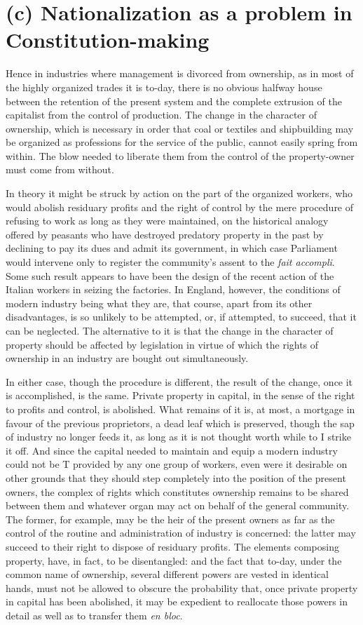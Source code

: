 \documentclass{book}
\begin{document}
\section{(c) Nationalization as a problem in Constitution-making}
Hence in industries where management is divorced from ownership, as in most of the highly organized trades it is to-day, there is no obvious halfway house between the retention of the present system and the complete extrusion of the capitalist from the control of production. The change in the character of ownership, which is necessary in order that coal or textiles and shipbuilding may be organized as professions for the service of the public, cannot easily spring from within. The blow needed to liberate them from the control of the property-owner must come from without.

In theory it might be struck by action on the part of the organized workers, who would abolish residuary profits and the right of control by the mere procedure of refusing to work as long as they were maintained, on the historical analogy offered by peasants who have destroyed predatory property in the past by declining to pay its dues and admit its government, in which case Parliament would intervene only to register the community’s assent to the \emph{fait accompli}. Some such result appears to have been the design of the recent action of the Italian workers in seizing the factories. In England, however, the conditions of modern industry being what they are, that course, apart from its other disadvantages, is so unlikely to be attempted, or, if attempted, to succeed, that it can be neglected. The alternative to it is that the change in the character of property should be affected by legislation in virtue of which the rights of ownership in an industry are bought out simultaneously.

In either case, though the procedure is different, the result of the change, once it is accomplished, is the same. Private property in capital, in the sense of the right to profits and control, is abolished. What remains of it is, at most, a mortgage in favour of the previous proprietors, a dead leaf which is preserved, though the sap of industry no longer feeds it, as long as it is not thought worth while to I strike it off. And since the capital needed to maintain and equip a modern industry could not be T provided by any one group of workers, even were it desirable on other grounds that they should step completely into the position of the present owners, the complex of rights which constitutes ownership remains to be shared between them and whatever organ may act on behalf of the general community. The former, for example, may be the heir of the present owners as far as the control of the routine and administration of industry is concerned: the latter may succeed to their right to dispose of residuary profits. The elements composing property, have, in fact, to be disentangled: and the fact that to-day, under the common name of ownership, several different powers are vested in identical hands, must not be allowed to obscure the probability that, once private property in capital has been abolished, it may be expedient to reallocate those powers in detail as well as to transfer them \emph{en bloc}.
\end{document}
